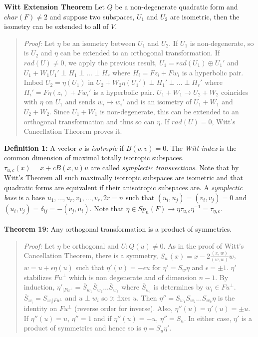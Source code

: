 {\bf Witt Extension Theorem}  Let $Q$ be a non-degenerate quadratic form and $char(F) \ne 2$ and
suppose two subspaces, $U_1$ and $U_2$ are isometric, then the isometry can be extended to all
of $V$.
\begin{quote}
\emph{Proof:}  
Let $\eta$ be an isometry between $U_1$ and $U_2$.  If $U_1$ is non-degenerate, so is $U_2$
and $\eta$ can be extended to an orthogonal transformation.  If $rad(U) \ne 0$, we
apply the previous result, $U_1 = rad(U_1 ) \oplus U_1'$ and
$U_1 + W_1 U_1' \perp H_1 \perp \ldots \perp H_r$ where $H_i= F z_i + F w_i$ is a hyperbolic pair.
Imbed $U_2= \eta(U_1 )$ in $U_2 + W_2
\eta(U_1') \perp H_1' \perp \ldots \perp H_r'$ where $H_i'= F \eta(z_i) + F w_i'$
is a hyperbolic pair.
$U_1 + W_1 \rightarrow U_2 + W_2$ coincides with $\eta$ on $U_1$ and sends $w_i \mapsto w_i'$
and is an isometry of
$U_1 + W_1$ and $U_2 + W_2$.  Since 
$U_1 + W_1$ is non-degenerate, this can be extended to an orthogonal transformation and
thus so can $\eta$.
If $rad(U) = 0$, Witt's Cancellation Theorem proves it.
\end{quote}
{\bf Definition 1:} A vector $v$ is \emph{isotropic} if $B(v,v)=0$.  The \emph{Witt index}
is the common dimension of maximal totally isotropic subspaces. $\tau_{u,c} (x)= x+cB(x,u)u$
are called \emph{symplectic transvections}.  Note that by Witt's Theorem all such maximally
isotropic subspaces are isometric and that quadratic forms are equivalent if their
anisotropic subspaces are.
A \emph{symplectic base} is a base
$u_1, \ldots, u_r, v_1 , \ldots , v_r, 2r=n$ such that $(u_i, u_j)=(v_i, v_j)=0$ and
$(u_i, v_j)= \delta_{ij}= - (v_j, u_i)$.  Note that 
$\eta \in Sp_n(F) \rightarrow \eta \tau_{u,c} \eta^{-1}= \tau_{\eta, c}$.
\\
\\
{\bf Theorem 19:}
Any orthogonal transformation is a product of symmetries.
\begin{quote}
\emph{Proof:}  
Let $\eta$ be orthogonal and $U: Q(u) \ne 0$.  As in the proof of Witt's Cancellation
Theorem, there is a symmetry, $S_w(x)= x- 2 {\frac {(x,w)}{(w,w)}}w$, 
$w= u + \epsilon \eta(u)$ such that $\eta'(u) = - \epsilon u$ for $\eta'= S_w \eta$ and
$\epsilon = \pm 1$.  $\eta'$ stabilizes $Fu^{\perp}$ which is non degenerate and of dimension
$n-1$.  By induction, 
$\eta'_{|F u ^{\perp}} = {\overline S}_{w_1} {\overline S}_{w_2} \ldots {\overline S}_{w_k}$
where ${\overline S}_{w_i}$ is determines by $w_i \in F u^{\perp}$.
${\overline S}_{w_i}= S_{w_i | F u^{\perp}} $ and $u \perp w_i$ so it fixes $u$.
Then $\eta''=
S_{w_1} S_{w_2} \ldots S_{w_k} \eta$ is the identity on $F u^{\perp}$ (reverse order for inverse).
Also, $\eta''(u)= \eta'(u)= \pm u$.  If 
$\eta''(u)= u$,
$\eta''=1$ and if
$\eta''(u)= -u$,
$\eta''= S_u$.  In either case, $\eta'$ is a product of symmetries and hence so is
$\eta= S_u \eta'$.
\end{quote}
